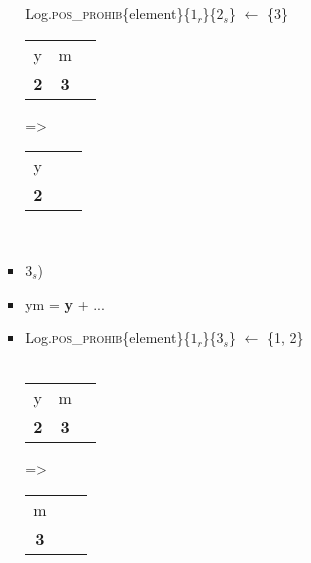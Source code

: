 \documentclass{article}
\begin{document}
\begin{itemize}
\begin{itemize}
\begin{enumerate}
\begin{itemize}
                \\ \\
                Log.\textsc{pos\_prohib}\{element\}\{\textsc{$1_r$}\}\{\textsc{$2_s$}\} $\leftarrow$ \{3\}
                \\
                \begin{tabular}{ |c|c|c| } 
                 \hline
                 y & m \\ 
                 \textbf{2} & \textbf{3} \\ 
                 \hline
                \end{tabular}
                =\textgreater~
               \begin{tabular}{ |c|c|c| } 
                 \hline
                 y \\ 
                 \textbf{2} \\ 
                 \hline
                \end{tabular}
                \\
                \item $3_s$)
                \item ym = \textbf{y} + ...
                \item  Log.\textsc{pos\_prohib}\{element\}\{\textsc{$1_r$}\}\{\textsc{$3_s$}\} $\leftarrow$ \{1, 2\}
                \\ ~~~
                \begin{tabular}{ |c|c|c| } 
                 \hline
                 y & m \\ 
                 \textbf{2} & \textbf{3} \\ 
                 \hline
                \end{tabular}
                =\textgreater~
                \begin{tabular}{ |c|c|c| } 
                 \hline
                 m \\ 
                 \textbf{3} \\ 
                 \hline
                \end{tabular}
                
            \end{itemize}
        \end{enumerate}
    \end{itemize}
\end{itemize}
\end{document}
